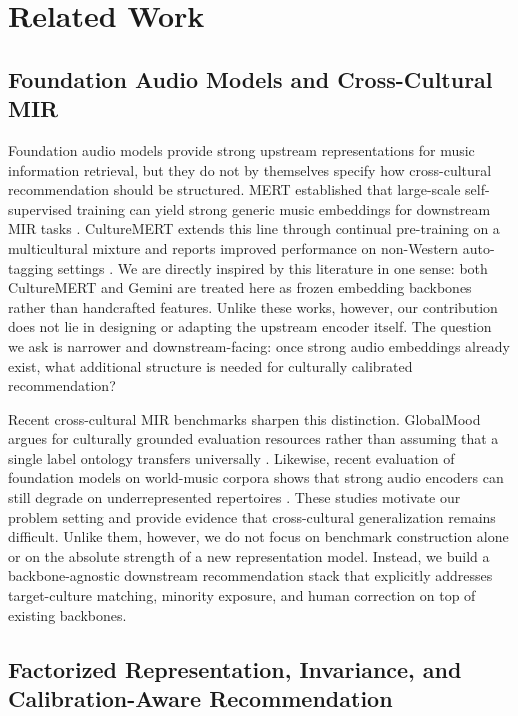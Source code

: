 \section{Related Work}
\label{sec:related}

\subsection{Foundation Audio Models and Cross-Cultural MIR}

Foundation audio models provide strong upstream representations for music information retrieval, but they do not by themselves specify how cross-cultural recommendation should be structured. MERT established that large-scale self-supervised training can yield strong generic music embeddings for downstream MIR tasks \cite{li2023mert}. CultureMERT extends this line through continual pre-training on a multicultural mixture and reports improved performance on non-Western auto-tagging settings \cite{kanatas2025culturemert}. We are directly inspired by this literature in one sense: both CultureMERT and Gemini are treated here as frozen embedding backbones rather than handcrafted features. Unlike these works, however, our contribution does not lie in designing or adapting the upstream encoder itself. The question we ask is narrower and downstream-facing: once strong audio embeddings already exist, what additional structure is needed for culturally calibrated recommendation?

Recent cross-cultural MIR benchmarks sharpen this distinction. GlobalMood argues for culturally grounded evaluation resources rather than assuming that a single label ontology transfers universally \cite{lee2025globalmood}. Likewise, recent evaluation of foundation models on world-music corpora shows that strong audio encoders can still degrade on underrepresented repertoires \cite{papaioannou2025universal}. These studies motivate our problem setting and provide evidence that cross-cultural generalization remains difficult. Unlike them, however, we do not focus on benchmark construction alone or on the absolute strength of a new representation model. Instead, we build a backbone-agnostic downstream recommendation stack that explicitly addresses target-culture matching, minority exposure, and human correction on top of existing backbones.

\subsection{Factorized Representation, Invariance, and Calibration-Aware Recommendation}

